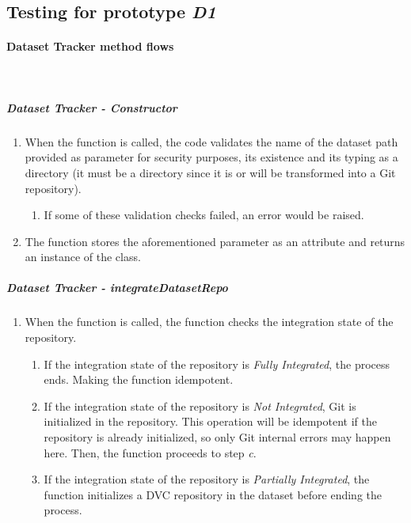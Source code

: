\subsection{Testing for prototype \emph{D1}}

\paragraph{Dataset Tracker method flows} \mbox{}\\

\subparagraph{Dataset Tracker - Constructor}

\begin{enumerate}
    \item When the function is called, the code validates the name of the dataset path provided as parameter for security purposes, its existence and its typing as a directory
    (it must be a directory since it is or will be transformed into a Git repository).

    \begin{enumerate}
        \item If some of these validation checks failed, an error would be raised.
    \end{enumerate}

    \item The function stores the aforementioned parameter as an attribute and returns an instance of the class. 
\end{enumerate}

\subparagraph{Dataset Tracker - integrateDatasetRepo}

\begin{enumerate}
    \item When the function is called, the function checks the integration state of the repository.
    \begin{enumerate}
        \item If the integration state of the repository is \emph{Fully Integrated}, the process ends. Making the function idempotent.
        
        \item If the integration state of the repository is \emph{Not Integrated}, Git is initialized in the repository. This operation will be idempotent if the repository is already initialized, so only Git internal errors may happen here.
        Then, the function proceeds to step \emph{c}.

        \item If the integration state of the repository is \emph{Partially Integrated}, the function initializes a DVC repository in the dataset before ending the process.
    \end{enumerate}
\end{enumerate}

